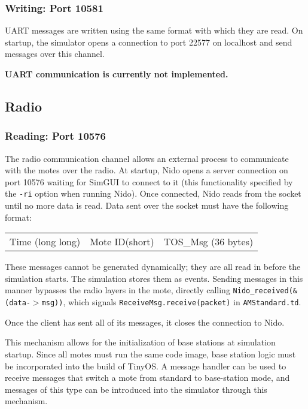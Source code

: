 \documentclass[10pt]{article}
\begin{document}
\subsubsection*{Writing: Port 10581}

UART messages are written using the same format with which they are
read. On startup, the simulator opens a connection to port 22577 on
localhost and send messages over this channel.

{\bf UART communication is currently not implemented.}

\subsection*{Radio}
\subsubsection*{Reading: Port 10576}

The radio communication channel allows an external process to
communicate with the motes over the radio. At startup, Nido opens a
server connection on port 10576 waiting for SimGUI to connect to
it (this functionality specified by the {\tt -ri} option when running
Nido). Once connected, Nido reads from the socket until no more data is
read. Data sent over the socket must have the following format:

\vspace{0.1in}
\begin{tabular}{|c|c|c|}\hline
\hspace{2in} & \hspace{2in} & \hspace{0.5in} \\ \hline
Time (long long)& Mote ID(short) & TOS\_Msg (36 bytes) \\ \hline
\end{tabular}
\vspace{0.1in}

These messages cannot be generated dynamically; they are all read in
before the simulation starts. The simulation stores them as
events. Sending messages in this manner bypasses the radio layers in
the mote, directly calling {\tt Nido\_received(\&(data-$>$msg))}, which
signals {\tt ReceiveMsg.receive(packet)} in {\tt AMStandard.td}.

Once the client has sent all of its messages, it closes the connection
to Nido.

This mechanism allows for the initialization of base stations at
simulation startup. Since all motes must run the same code image, base
station logic must be incorporated into the build of TinyOS. A message
handler can be used to receive messages that switch a mote from
standard to base-station mode, and messages of this type can be
introduced into the simulator through this mechanism.
\end{document}
